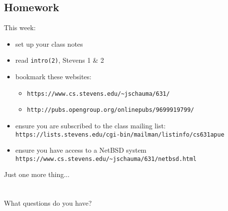 \documentclass[sxga]{xdvislides}
\begin{document}
\subsection{Homework}
This week:
\begin{itemize}
	\item set up your class notes
	\item read {\tt intro(2)}, Stevens 1 \& 2
	\item bookmark these websites:
		\begin{itemize}
			\item {\tt https://www.cs.stevens.edu/\~{}jschauma/631/}
			\item {\tt http://pubs.opengroup.org/onlinepubs/9699919799/}
		\end{itemize}
	\item ensure you are subscribed to the class mailing list: \\
		{\tt https://lists.stevens.edu/cgi-bin/mailman/listinfo/cs631apue}
	\item ensure you have access to a NetBSD system
		{\tt https://www.cs.stevens.edu/\~{}jschauma/631/netbsd.html}
	\vspace{.5in}
\end{itemize}

\newpage
\vspace*{\fill}
\begin{center}
    \Hugesize
        Just one more thing...\\ [1em]
    \hspace*{5mm}
    \blueline\\
    \hspace*{5mm}\\
	What questions do you have?
\end{center}
\vspace*{\fill}
\end{document}
